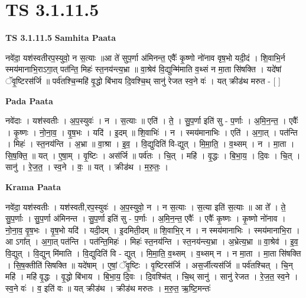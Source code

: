 \documentclass[17pt]{extarticle}
\begin{document}
\section{ TS 3.1.11.5 }

\textbf{TS 3.1.11.5 } \newline
\textbf{Samhita Paata} \newline

नवे॑दा॒ यश॑स्वतीरप॒स्युवो॒ न स॒त्याः ॥आ ते॑ सुप॒र्णा अ॑मिनन्त॒ एवैः᳚ कृ॒ष्णो नो॑नाव वृष॒भो यदी॒दं । शि॒वाभि॒र्न स्मय॑मानाभि॒राऽगा॒त् पत॑न्ति॒ मिहः॑ स्त॒नय॑न्त्य॒भ्रा ॥ वा॒श्रेव॑ वि॒द्युन्मि॑माति व॒थ्सं न मा॒ता सि॑षक्ति । यदे॑षां ॅवृ॒ष्टिरस॑र्जि ॥ पर्व॑तश्चि॒न्महि॑ वृ॒द्धो बि॑भाय दि॒वश्चि॒थ् सानु॑ रेजत स्व॒ने वः॑ । यत् क्रीड॑थ मरुत - [  ] \newline

\textbf{Pada Paata} \newline

नवे॑दाः । यश॑स्वतीः । अ॒प॒स्युवः॑ । न । स॒त्याः ॥ एति॑ । ते॒ । सु॒प॒र्णा इति॑ सु - प॒र्णाः । अ॒मि॒न॒न्त॒ । एवैः᳚ । कृ॒ष्णः । नो॒ना॒व॒ । वृ॒ष॒भः । यदि॑ । इ॒दम् ॥ शि॒वाभिः॑ । न । स्मय॑मानाभिः । एति॑ । अ॒गा॒त् । पत॑न्ति । मिहः॑ । स्त॒नय॑न्ति । अ॒भ्रा ॥ वा॒श्रा । इ॒व॒ । वि॒द्युदिति॑ वि-द्युत् । मि॒मा॒ति॒ । व॒थ्सम् । न । मा॒ता । सि॒ष॒क्ति॒ ॥ यत् । ए॒षा॒म् । वृ॒ष्टिः । अस॑र्जि ॥ पर्व॑तः । चि॒त् । महि॑ । वृ॒द्धः । बि॒भा॒य॒ । दि॒वः । चि॒त् । सानु॑ । रे॒ज॒त॒ । स्व॒ने । वः॒ ॥ यत् । क्रीड॑थ । म॒रु॒तः॒ ।  \newline


\textbf{Krama Paata} \newline

नवे॑दा॒ यश॑स्वतीः । यश॑स्वती,रप॒स्युवः॑ । अ॒प॒स्युवो॒ न । न स॒त्याः । स॒त्या इति॑ स॒त्याः ॥ आ ते᳚ । ते॒ सु॒प॒र्णाः । सु॒प॒र्णा अ॑मिनन्त । सु॒प॒र्णा इति॑ सु - प॒र्णाः । अ॒मि॒न॒न्त॒ एवैः᳚ । एवैः᳚ कृ॒ष्णः । कृ॒ष्णो नो॑नाव । नो॒ना॒व॒ वृ॒ष॒भः । वृ॒ष॒भो यदि॑ । यदी॒दम् । इ॒दमिती॒दम् ॥ शि॒वाभि॒र् न । न स्मय॑मानाभिः । स्मय॑मानाभि॒रा । आ ऽगा᳚त् । अ॒गा॒त् पत॑न्ति । पत॑न्ति॒मिहः॑ । मिहः॑ स्त॒नय॑न्ति । स्त॒नय॑न्त्य॒भ्रा । अ॒भ्रेत्य॒भ्रा ॥ वा॒श्रेव॑ । इ॒व॒ वि॒द्युत् । वि॒द्युन् मि॑माति । वि॒द्युदिति॑ वि - द्युत् । मि॒मा॒ति॒ व॒थ्सम् । व॒थ्सम् न । न मा॒ता । मा॒ता सि॑षक्ति । सि॒ष॒क्तीति॑ सिषक्ति ॥ यदे॑षाम् । ए॒षां॒ ॅवृ॒ष्टिः । वृ॒ष्टिरस॑र्जि । अस॒र्जीत्यस॑र्जि ॥ पर्व॑तश्चित् । चि॒न् महि॑ । महि॑ वृ॒द्धः । वृ॒द्धो बि॑भाय । बि॒भा॒य॒ दि॒वः । दि॒वश्चि॑त् । चि॒थ् सानु॑ । सानु॑ रेजत । रे॒ज॒त॒ स्व॒ने । स्व॒ने वः॑ । व॒ इति॑ वः ॥ यत् क्रीड॑थ । क्रीड॑थ मरुतः । म॒रु॒त॒ ऋ॒ष्टि॒मन्तः॑ \newline
\end{document}
